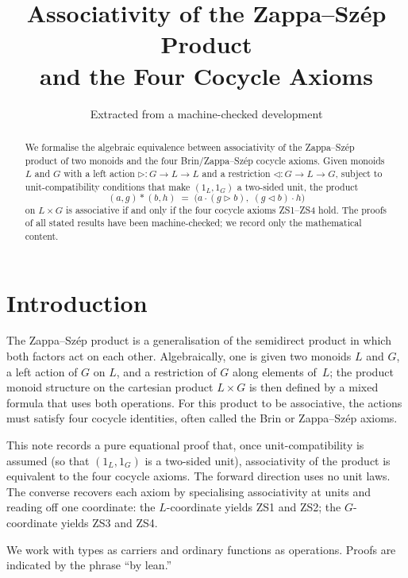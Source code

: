 \documentclass[11pt,a4paper]{article}
\title{Associativity of the Zappa--Sz\'{e}p Product\\
  and the Four Cocycle Axioms}
\author{Extracted from a machine-checked development}
\date{}
\theoremstyle{plain}
\theoremstyle{definition}
\begin{document}
\maketitle

\begin{abstract}
We formalise the algebraic equivalence between associativity of the
Zappa--Sz\'{e}p product of two monoids and the four Brin/Zappa--Sz\'{e}p
cocycle axioms. Given monoids $L$ and $G$ with a left action
$\triangleright : G \to L \to L$ and a restriction
$\triangleleft : G \to L \to G$, subject to unit-compatibility conditions that
make $(1_L, 1_G)$ a two-sided unit, the product
\[
  (a,g) * (b,h)
  \;=\;
  \bigl( a \cdot (g \triangleright b),\;
         (g \triangleleft b) \cdot h \bigr)
\]
on $L \times G$ is associative if and only if the four cocycle axioms ZS1--ZS4
hold. The proofs of all stated results have been machine-checked; we record
only the mathematical content.
\end{abstract}

\tableofcontents
\bigskip

\section{Introduction}

The Zappa--Sz\'{e}p product is a generalisation of the semidirect product in
which both factors act on each other. Algebraically, one is given two monoids
$L$ and $G$, a left action of $G$ on $L$, and a restriction of $G$ along
elements of~$L$; the product monoid structure on the cartesian product
$L \times G$ is then defined by a mixed formula that uses both operations. For
this product to be associative, the actions must satisfy four cocycle
identities, often called the Brin or Zappa--Sz\'{e}p axioms.

This note records a pure equational proof that, once unit-compatibility is
assumed (so that $(1_L, 1_G)$ is a two-sided unit), associativity of the
product is equivalent to the four cocycle axioms. The forward direction uses
no unit laws. The converse recovers each axiom by specialising associativity
at units and reading off one coordinate: the $L$-coordinate yields ZS1 and
ZS2; the $G$-coordinate yields ZS3 and ZS4.

We work with types as carriers and ordinary functions as operations. Proofs
are indicated by the phrase ``by lean.''
\end{document}
